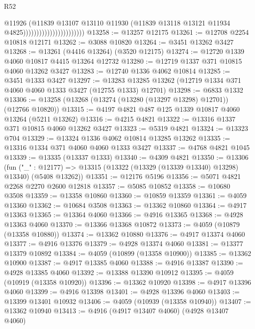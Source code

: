 \begin{lexlean}{R52}
\begin{coremodule}
                                              @11926
                                              (@11839
                                                @13107
                                                @13110
                                                @11930
                                                (@11839
                                                  @13118
                                                  @13121
                                                  @11934
                                                  @4825)))))))))))))))))))))))
@13258 := @13257 @12175
@13261 := @12708 @2254 @10818 @12171
@13262 := @3088 @10820
@13264 := @3451 @13262 @3427
@13268 := @13261 (@4416 @13264) (@3520 @12175)
@13274 := @12720 @1339 @4060 @10817 @4415 @13264 @12732
@13280 := @12719 @1337 @371 @10815 @4060 @13262 @3427
@13283 := @12740 @1336 @4062 @10814
@13285 := @3451 @1333 @3427
@13297 := @13283 @13285 @13262 (@12719 @1334 @371 @4060 @4060 @1333 @3427 (@12755 @1333) @12701)
@13298 := @6833 @1332
@13306 := @13258 (@13268 (@13274 (@13280 (@13297 @13298) @12701)) (@12766 @10820))
@13315 := @4197 @4821 @487 @125 @1339 @10817 @4060 @13264 (@5211 @13262)
@13316 := @4215 @4821
@13322 := @13316 @1337 @371 @10815 @4060 @13262 @3427
@13323 := @5319 @4821
@13324 := @13323 @704
@13329 := @13324 @1336 @4062 @10814 @13285 @13262
@13335 := @13316 @1334 @371 @4060 @4060 @1333 @3427
@13337 := @4768 @4821 @1045
@13339 := @13335 (@13337 @1333)
@13340 := @4309 @4821
@13350 := @13306
    (fun ("_" : @12177) => @13315 (@13322 (@13329 (@13339 @13340) @13298) @13340) (@5408 @13262))
@13351 := @12176 @5196
@13356 := @5071 @4821 @2268 @2270 @2600 @12818
@13357 := @5085 @10852
@13358 := @10680 @3508
@13359 := @13358 @10860
@13360 := @10859 @13359
@13361 := @4059 @13360
@13362 := @10684 @3508
@13363 := @13362 @10860
@13364 := @4917 @13363
@13365 := @13364 @4060
@13366 := @4916 @13365
@13368 := @4928 @13363 @4060
@13370 := @13366 @13368 @10872
@13373 := @4059 (@10879 (@13358 @10880))
@13374 := @13362 @10880
@13376 := @4917 @13374 @4060
@13377 := @4916 @13376
@13379 := @4928 @13374 @4060
@13381 := @13377 @13379 @10892
@13384 := @4059 (@10899 (@13358 @10900))
@13385 := @13362 @10900
@13387 := @4917 @13385 @4060
@13388 := @4916 @13387
@13390 := @4928 @13385 @4060
@13392 := @13388 @13390 @10912
@13395 := @4059 (@10919 (@13358 @10920))
@13396 := @13362 @10920
@13398 := @4917 @13396 @4060
@13399 := @4916 @13398
@13401 := @4928 @13396 @4060
@13403 := @13399 @13401 @10932
@13406 := @4059 (@10939 (@13358 @10940))
@13407 := @13362 @10940
@13413 := @4916 (@4917 @13407 @4060) (@4928 @13407 @4060)

\end{coremodule}
\end{lexlean}
